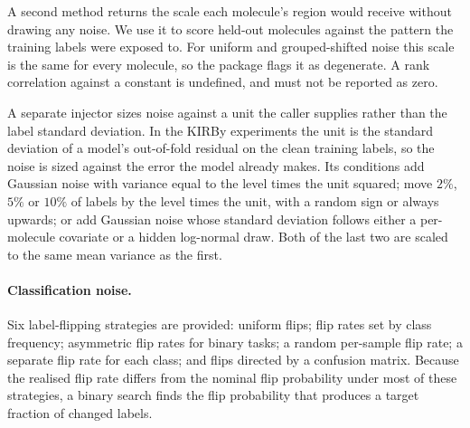 A second method returns the scale each molecule's region would receive without drawing any noise.
We use it to score held-out molecules against the pattern the training labels were exposed to. For
uniform and grouped-shifted noise this scale is the same for every molecule, so the package flags it
as degenerate. A rank correlation against a constant is undefined, and must not be reported as zero.

A separate injector sizes noise against a unit the caller supplies rather than the label standard
deviation. In the KIRBy experiments the unit is the standard deviation of a model's out-of-fold residual on
the clean training labels, so the noise is sized against the error the model already makes. Its
conditions add Gaussian noise with variance equal to the level times the unit squared; move $2\%$,
$5\%$ or $10\%$ of labels by the level times the unit, with a random sign or always upwards; or add
Gaussian noise whose standard deviation follows either a per-molecule covariate or a hidden
log-normal draw. Both of the last two are scaled to the same mean variance as the first.

\paragraph{Classification noise.} Six label-flipping strategies are provided: uniform flips; flip
rates set by class frequency; asymmetric flip rates for binary tasks; a random per-sample flip rate;
a separate flip rate for each class; and flips directed by a confusion matrix. Because the realised
flip rate differs from the nominal flip probability under most of these strategies, a binary search
finds the flip probability that produces a target fraction of changed labels.

